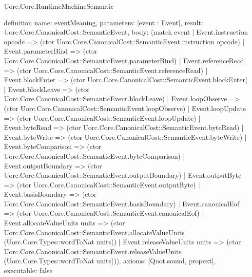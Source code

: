 \begin{lexlean}{Uorc.Core.RuntimeMachineSemantic}
\begin{semanticmodule}
definition{
  name: eventMeaning,
  parameters: [event : Event],
  result: Uorc.Core.CanonicalCost::SemanticEvent,
  body: (match event
    | Event.instruction opcode => (ctor Uorc.Core.CanonicalCost::SemanticEvent.instruction opcode)
    | Event.parameterBind => (ctor Uorc.Core.CanonicalCost::SemanticEvent.parameterBind)
    | Event.referenceRead => (ctor Uorc.Core.CanonicalCost::SemanticEvent.referenceRead)
    | Event.blockEnter => (ctor Uorc.Core.CanonicalCost::SemanticEvent.blockEnter)
    | Event.blockLeave => (ctor Uorc.Core.CanonicalCost::SemanticEvent.blockLeave)
    | Event.loopObserve => (ctor Uorc.Core.CanonicalCost::SemanticEvent.loopObserve)
    | Event.loopUpdate => (ctor Uorc.Core.CanonicalCost::SemanticEvent.loopUpdate)
    | Event.byteRead => (ctor Uorc.Core.CanonicalCost::SemanticEvent.byteRead)
    | Event.byteWrite => (ctor Uorc.Core.CanonicalCost::SemanticEvent.byteWrite)
    | Event.byteComparison => (ctor Uorc.Core.CanonicalCost::SemanticEvent.byteComparison)
    | Event.outputBoundary => (ctor Uorc.Core.CanonicalCost::SemanticEvent.outputBoundary)
    | Event.outputByte => (ctor Uorc.Core.CanonicalCost::SemanticEvent.outputByte)
    | Event.basisBoundary => (ctor Uorc.Core.CanonicalCost::SemanticEvent.basisBoundary)
    | Event.canonicalEof => (ctor Uorc.Core.CanonicalCost::SemanticEvent.canonicalEof)
    | Event.allocateValueUnits units => (ctor Uorc.Core.CanonicalCost::SemanticEvent.allocateValueUnits (Uorc.Core.Types::wordToNat units))
    | Event.releaseValueUnits units => (ctor Uorc.Core.CanonicalCost::SemanticEvent.releaseValueUnits (Uorc.Core.Types::wordToNat units))),
  axioms: [Quot.sound, propext],
  executable: false
}


\end{semanticmodule}
\end{lexlean}
